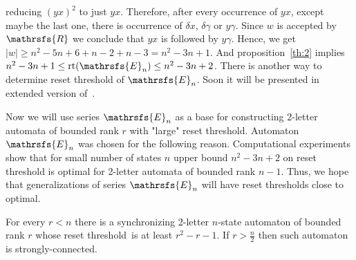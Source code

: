 \documentclass[11pt]{llncs}
\newcommand{\rl}{reset threshold}
\newcommand{\R}{\mathrsfs{R}}
\newcommand{\g}{\gamma}
\newcommand{\dl}{\delta}
\newcommand{\rt}{\mathrm{rt}}
\newcommand{\rtc}{\mathrm{rt}_{c}}
\begin{document}
reducing $(yx)^2$ to just $yx$. Therefore, after every occurrence of $yx$, except maybe the last one, there is occurrence 
of $\dl x$, $\dl \g$ or $y \g$. Since $w$ is accepted by $\R$ we conclude that $yx$ is followed by $y\g$.
Hence, we get $|w| \geq n^2 - 5n + 6 + n - 2 + n - 3 = n^2 -3n + 1$.
And proposition~\ref{th:2} implies $n^2 -3n + 1 \leq \rt(\mathrsfs{E}_n) \leq n^2 -3n + 2$. 
There is another way to determine reset threshold of $\mathrsfs{E}_n$. Soon it will be presented in
extended version of~\cite{AGV}.

Now we will use series $\mathrsfs{E}_n$ as a base for constructing 2-letter automata of bounded
rank $r$ with "large" reset threshold. Automaton $\mathrsfs{E}_n$ was chosen for the following reason.
Computational experiments show that for small number of states $n$ upper bound $n^2 -3n +2$ on reset threshold is optimal
for 2-letter automata of bounded rank $n - 1$.
Thus, we hope that generalizations of series $\mathrsfs{E}_n$ will have reset thresholds close to optimal.

\begin{proposition}
For every $r < n$ there is a synchronizing 2-letter $n$-state automaton of bounded rank $r$ whose \rl\ is at least 
$r^2 -r - 1$. If $r > \frac{n}{2}$ then such automaton is strongly-connected.
\end{proposition}
\end{document}
